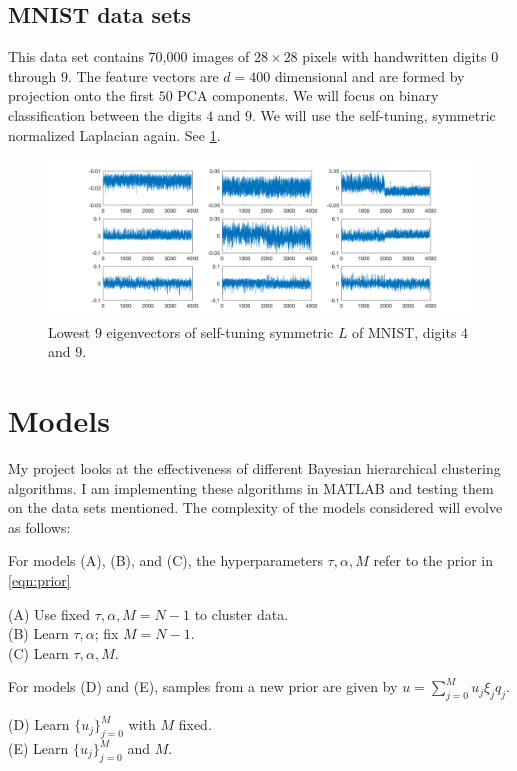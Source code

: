 \documentclass{siamart1116}
\begin{document}
\subsection{MNIST data sets}
This data set contains 70,000 images of $28 \times 28$ pixels with handwritten digits $0$ through $9$. The feature vectors are $d=400$ dimensional and are formed by projection onto the first $50$ PCA components. We will focus on binary classification between the digits $4$ and $9$. We will use the self-tuning, symmetric normalized Laplacian again. See \cref{fig:mnist_spec}.

\begin{figure}[!htb]
\caption{\label{fig:mnist_spec} Lowest $9$ eigenvectors of self-tuning symmetric $L$ of MNIST, digits $4$ and $9$.}
\includegraphics[width=\linewidth]{laplacians/mnist_laplacian.png}
\end{figure}


\section{Models}
My project looks at the effectiveness of different Bayesian hierarchical clustering algorithms. I am implementing these algorithms in MATLAB and testing them on the data sets mentioned. The complexity of the models considered will evolve as follows:

For models (A), (B), and (C), the hyperparameters $\tau,\alpha,M$ refer to the prior in \cref{eqn:prior}

(A) Use fixed $\tau,\alpha, M=N-1$ to cluster data.\\
(B) Learn $\tau,\alpha$; fix $M=N-1$.\\
(C) Learn $\tau,\alpha,M$.

For models (D) and (E), samples from a new prior are given by $u = \sum_{j=0}^M u_j\xi_j q_j$.

(D) Learn $\{u_j\}_{j=0}^M$ with $M$ fixed.\\
(E) Learn $\{u_j\}_{j=0}^M$ and $M$.
\end{document}
